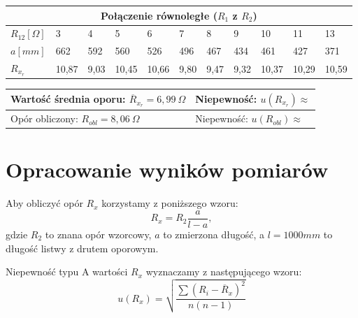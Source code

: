 \documentclass[a4paper,11pt]{article}
\begin{document}
\begin{table}[!ht]
\setlength{\extrarowheight}{5pt}
\centering
\begin{tabularx}{\textwidth}{XXXXXXXXXXX}

\multicolumn{11}{c}{\textbf{Połączenie równoległe ($R_1$ z $R_2$)}}\\        
\hline
$R_{12}[\Omega]$  & 3 &4 &5 &6 &7 &8 &9 &10 &11 &13\\
\hline
$a[mm]$  & 662 & 592 & 560 & 526 & 496 & 467 & 434 & 461 & 427 & 371
  \\
\hline
$R_{x_r}$ & 10,87 & 9,03 & 10,45 & 10,66 & 9,80 & 9,47 & 9,32 & 10,37 & 10,29 & 10,59\\    
\hline   
\end{tabularx}
\begin{tabularx}{\textwidth}{XX}
   
Wartość średnia oporu: $\overline{R}_{x_r}=6,99~\Omega $ & Niepewność: $u(R_{x_r})\approx $ \\ \hline
Opór obliczony: $R_{obl} = 8,06~\Omega$ & Niepewność: $u(R_{obl})\approx $\\
\end{tabularx}
\end{table}


\section{Opracowanie wyników pomiarów}
Aby obliczyć opór $R_x$ korzystamy z poniższego wzoru:
$$
R_x = R_2 \frac{a}{l-a},
$$
gdzie $R_2$ to znana opór wzorcowy, $a$ to zmierzona długość, a $l=1000mm$ to długość  listwy z drutem oporowym.

Niepewność typu A wartości $R_x$ wyznaczamy z następującego wzoru:
$$
u(R_x) = \sqrt{\frac{\sum \left( R_i - \overline{R}_x \right)^2 }{n(n-1)}}
$$
\end{document}
